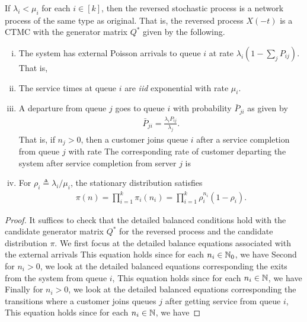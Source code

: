 \documentclass[a4paper,10pt,english]{article}
\begin{document}
\begin{thm}
If $\lambda_i < \mu_i$ for each $i \in [k]$, then the reversed stochastic process is a network process of the same type as original. 
That is, the reversed process $X(-t)$ is a CTMC with the generator matrix $Q^{\ast}$ given by the following.  
\begin{enumerate}[(i)]
\item The system has external Poisson arrivals to queue $i$ at rate $\lambda_i(1-\sum_jP_{ij})$. 
That is, 
\item The service times at queue $i$ are \textit{iid} exponential with rate $\mu_i$. 
\item  A departure from queue $j$ goes to queue $i$ with probability $\bar{P}_{ji}$ as given by
\begin{align*}
\bar{P}_{ji}=\frac{\lambda_i P_{ij}}{\lambda_j}.
\end{align*}
That is, if $n_j > 0$, then a customer joins queue $i$ after a service completion from queue $j$ with rate 
The corresponding rate of customer departing the system after service completion from server $j$ is
\item For $\rho_i \triangleq \lambda_i/\mu_i$, the stationary distribution satisfies
\begin{align*}
\pi(n)= \prod_{i=1}^k\pi_i(n_i) = \prod_{i=1}^k\rho_i^{n_i}(1-\rho_i).
\end{align*}
\end{enumerate}
\end{thm}
\begin{proof} 
It suffices to check that the detailed balanced conditions hold with the candidate generator matrix $Q^{\ast}$ for the reversed process and the candidate distribution $\pi$. 
We first focus at the detailed balance equations associated with the external arrivals 
This equation holds since for each $n_i \in \mathbb{N}_0$, we have 
Second for $n_i > 0$, we look at the detailed balanced equations corresponding the exits from the system from queue $i$,
This equation holds since for each $n_i \in \mathbb{N}$, we have 
Finally for $n_i > 0$, we look at the detailed balanced equations corresponding the transitions where a customer joins queues $j$ after getting service from queue $i$,
This equation holds since for each $n_i \in \mathbb{N}$, we have 
\end{proof}
\end{document}
